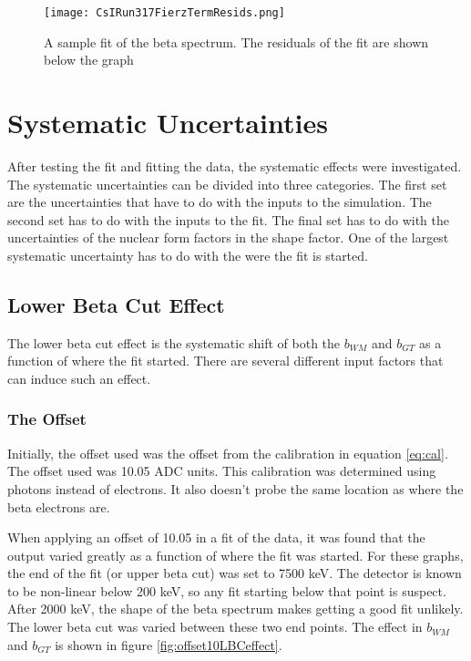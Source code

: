\documentclass[../MaxHughesThesis.tex]{subfiles}
\begin{document}
\begin{figure}[!htb]
	\centerline{\texttt{[image: CsIRun317FierzTermResids.png]}}
	\caption{A sample fit of the beta spectrum. 
		 The residuals of the fit are shown below the graph}
	\label{fig:samplefit}
\end{figure}

\section{Systematic Uncertainties}

After testing the fit and fitting the data, the systematic effects were investigated.
The systematic uncertainties can be divided into three categories.
The first set are the uncertainties that have to do with the inputs to the simulation.
The second set has to do with the inputs to the fit.
The final set has to do with the uncertainties of the nuclear form factors in the shape factor. 
One of the largest systematic uncertainty has to do with the were the fit is started. 

\subsection{Lower Beta Cut Effect}

The lower beta cut effect is the systematic shift of both the $b_{WM}$ and $b_{GT}$ as a function of where the fit started.
There are several different input factors that can induce such an effect.

\subsubsection{The Offset}
Initially, the offset used was the offset from the calibration in equation \ref{eq:cal}.
The offset used was 10.05 ADC units.
This calibration was determined using photons instead of electrons.
It also doesn't probe the same location as where the beta electrons are.

When applying an offset of 10.05 in a fit of the data, it was found that the output varied greatly as a function of where the fit was started.
For these graphs, the end of the fit (or upper beta cut) was set to 7500 keV.
The detector is known to be non-linear below 200 keV, so any fit starting below that point is suspect. 
After 2000 keV, the shape of the beta spectrum makes getting a good fit unlikely.
The lower beta cut was varied between these two end points.
The effect in $b_{WM}$ and $b_{GT}$ is shown in figure \ref{fig:offset10LBCeffect}.
\end{document}
